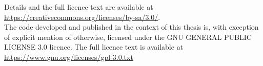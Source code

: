 Details and the full licence text are available at \url{https://creativecommons.org/licenses/by-sa/3.0/}.\\

The code developed and published in the context of this thesis is, with exception of explicit mention of otherwise, licensed under the GNU GENERAL PUBLIC LICENSE 3.0 licence. The full licence text is available at \url{https://www.gnu.org/licenses/gpl-3.0.txt}





